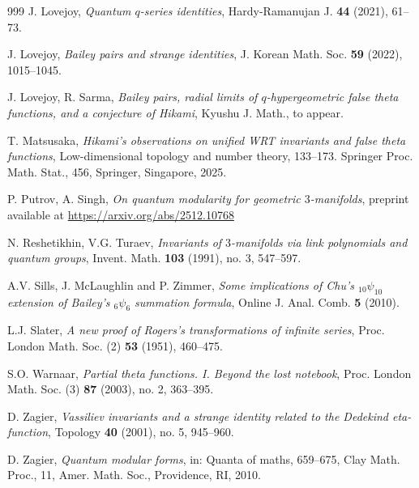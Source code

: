 \documentclass[11pt,reqno]{amsart}
\theoremstyle{definition}
\numberwithin{equation}{section}
\renewcommand{\=}{\;=\;}
\begin{document}
\begin{thebibliography}{999}
J. Lovejoy, \emph{Quantum $q$-series identities}, Hardy-Ramanujan J. \textbf{44} (2021), 61--73.

J. Lovejoy, \emph{Bailey pairs and strange identities}, J. Korean Math. Soc. {\bf 59} (2022), 1015--1045.

J. Lovejoy, R. Sarma, \emph{Bailey pairs, radial limits of $q$-hypergeometric false theta functions, and a conjecture of Hikami}, Kyushu J. Math., to appear.

T. Matsusaka, \emph{Hikami's observations on unified WRT invariants and false theta functions}, Low-dimensional topology and number theory, 133--173. Springer Proc. Math. Stat., 456, Springer, Singapore, 2025.

P. Putrov, A. Singh, \emph{On quantum modularity for geometric $3$-manifolds}, preprint available at \url{https://arxiv.org/abs/2512.10768}

N. Reshetikhin, V.G. Turaev, \emph{Invariants of $3$-manifolds via link polynomials and quantum groups}, Invent. Math. \textbf{103} (1991), no. 3, 547--597.

A.V. Sills, J. McLaughlin and P. Zimmer, \emph{Some implications of Chu's $_{10}\psi_{10}$ extension of Bailey's $_6\psi_6$ summation formula}, Online J. Anal. Comb. {\bf 5} (2010).   

L.J. Slater, \emph{A new proof of Rogers's transformations of infinite series}, Proc. London Math. Soc. (2) {\bf 53} (1951), 460--475.

S.O. Warnaar, \emph{Partial theta functions. I. Beyond the lost notebook}, Proc. London Math. Soc. (3) {\bf 87} (2003), no. 2, 363--395.

D. Zagier, \emph{Vassiliev invariants and a strange identity related to the Dedekind eta-function}, Topology {\bf 40} (2001), no. 5, 945--960.

D. Zagier, \emph{Quantum modular forms}, in: Quanta of maths, 659--675, Clay Math. Proc., 11, Amer. Math. Soc., Providence, RI, 2010.

\end{thebibliography}
\end{document}
